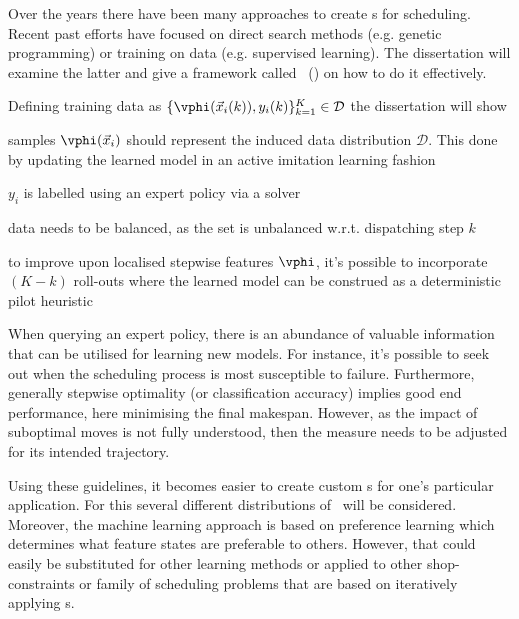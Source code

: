 
Over the years there have been many approaches to create \dr s for scheduling.
Recent past efforts have focused on direct search methods (e.g. genetic 
programming) or training on data (e.g. supervised learning).
The dissertation will examine the latter and give a framework called 
\fullnameAlice\ (\Alice) on how to do it effectively. 

Defining training data as 
\mbox{$\{\vphi(\vec{x}_i(k)),y_i(k)\}_{k=1}^K\in\mathcal{D}$} the dissertation 
will show
\begin{enumerate*}
    \item samples $\vphi(\vec{x}_i)$ should represent the induced data 
    distribution $\mathcal{D}$. This done by updating the learned model in an 
    active imitation learning fashion
    \item $y_i$ is labelled using an expert policy via a solver
    \item data needs to be balanced, as the set is unbalanced w.r.t. 
    dispatching step $k$
    \item to improve upon localised stepwise features $\vphi$, it's possible to 
    incorporate $(K-k)$ roll-outs where the learned model can be construed as a 
    deterministic pilot heuristic
\end{enumerate*}

When querying an expert policy, there is an abundance of valuable information 
that can be utilised for learning new models.
For instance, it's possible to seek out when the scheduling process is most 
susceptible to failure.
Furthermore, generally stepwise optimality (or classification accuracy) 
implies good end performance, here minimising the final makespan. 
However, as the impact of suboptimal moves is not fully understood, then the 
measure needs to be adjusted for its intended trajectory.

Using these guidelines, it becomes easier to create custom \dr s for one's 
particular application. For this several different distributions of \jsp\ 
will be considered.
Moreover, the machine learning approach is based on preference learning 
which determines what feature states are preferable to others. 
However, that could easily be substituted for other learning methods or applied 
to other shop-constraints or family of scheduling problems that are based on 
iteratively applying \dr s.

